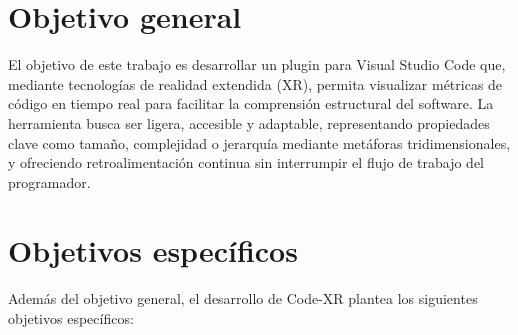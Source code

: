 \documentclass[a4paper, 12pt]{book}
\begin{document}



\section{Objetivo general}
\label{sec:objetivo-general}

El objetivo de este trabajo es desarrollar un plugin para Visual Studio Code que, mediante tecnologías de realidad extendida (XR), permita visualizar métricas de código en tiempo real para facilitar la comprensión estructural del software. La herramienta busca ser ligera, accesible y adaptable, representando propiedades clave como tamaño, complejidad o jerarquía mediante metáforas tridimensionales, y ofreciendo retroalimentación continua sin interrumpir el flujo de trabajo del programador.

\section{Objetivos específicos}
\label{sec:objetivos-especificos}

Además del objetivo general, el desarrollo de Code-XR plantea los siguientes objetivos específicos:
\end{document}
